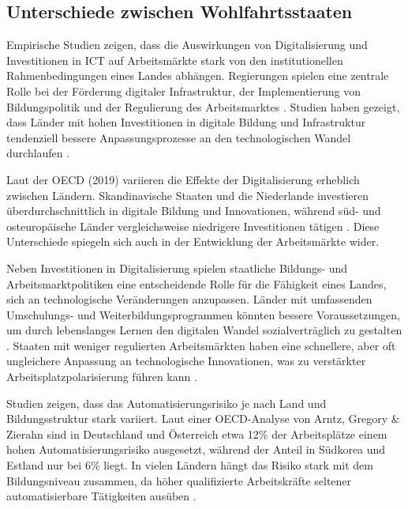 
\subsection{Unterschiede zwischen Wohlfahrtsstaaten}

Empirische Studien zeigen, dass die Auswirkungen von Digitalisierung und Investitionen in
\ac{ICT} auf Arbeitsmärkte stark von den institutionellen Rahmenbedingungen eines Landes 
abhängen. Regierungen spielen eine zentrale Rolle bei der Förderung digitaler Infrastruktur, 
der Implementierung von Bildungspolitik und der Regulierung des 
Arbeitsmarktes \parencite[vgl.][S. 4–5]{hall2001varieties}. Studien haben gezeigt, dass 
Länder mit hohen Investitionen in digitale Bildung und Infrastruktur tendenziell bessere 
Anpassungsprozesse an den technologischen Wandel durchlaufen 
\parencite[vgl.][S. 22–23]{oecd2020digital}.

Laut der \ac{OECD} (2019) variieren die Effekte der Digitalisierung erheblich zwischen 
Ländern. Skandinavische Staaten und die Niederlande investieren überdurchschnittlich in 
digitale Bildung und Innovationen, während süd- und osteuropäische Länder vergleichsweise 
niedrigere Investitionen tätigen \parencite[vgl.][S. 24]{oecd2020digital}. Diese 
Unterschiede spiegeln sich auch in der Entwicklung der Arbeitsmärkte wider.

Neben Investitionen in Digitalisierung spielen staatliche Bildungs- und 
Arbeitsmarktpolitiken eine entscheidende Rolle für die Fähigkeit eines Landes, sich an 
technologische Veränderungen anzupassen. Länder mit umfassenden Umschulungs- und 
Weiterbildungsprogrammen könnten bessere Voraussetzungen, um durch lebenslanges Lernen 
den digitalen Wandel sozialverträglich zu gestalten \parencite[vgl.][S. 370–371]{vu2011ict}. 
Staaten mit weniger regulierten Arbeitsmärkten haben eine schnellere, aber oft ungleichere 
Anpassung an technologische Innovationen, was zu verstärkter Arbeitsplatzpolarisierung führen 
kann \parencite[vgl.][S. 27–28]{hall2001varieties}.

Studien zeigen, dass das Automatisierungsrisiko je nach Land und Bildungsstruktur stark 
variiert. Laut einer OECD-Analyse von Arntz, Gregory \& Zierahn sind in Deutschland und 
Österreich etwa 12\% der Arbeitsplätze einem hohen Automatisierungsrisiko ausgesetzt, 
während der Anteil in Südkorea und Estland nur bei 6\% liegt. In vielen Ländern hängt 
das Risiko stark mit dem Bildungsniveau zusammen, da höher qualifizierte Arbeitskräfte 
seltener automatisierbare Tätigkeiten ausüben \parencite[vgl.][S. 15–16]{arntz2016therisk}. 


